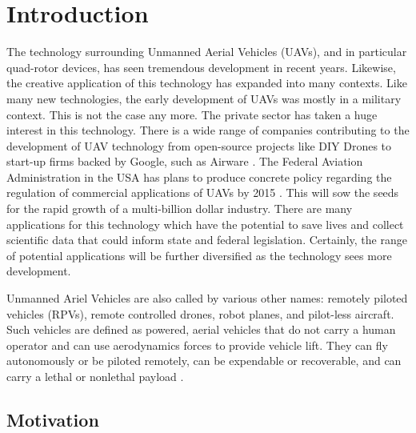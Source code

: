 
\chapter{Introduction} %

\label{Introduction} %



The technology surrounding Unmanned Aerial Vehicles (UAVs), and in particular quad-rotor devices, has seen tremendous development in recent years. Likewise, the creative application of this technology has expanded into many contexts. Like many new technologies, the early development of UAVs was mostly in a military context. This is not the case any more. The private sector has taken a huge interest in this technology. There is a wide range of companies contributing to the development of UAV technology from open-source projects like DIY Drones \cite{diydrones:2014:Online} to start-up firms backed by Google, such as Airware \cite{Airware:2014:Online}.  The Federal Aviation Administration in the USA has plans to produce concrete policy regarding the regulation of commercial applications of UAVs by 2015 \cite{faa:2014:Online}. This will sow the seeds for the rapid growth of a multi-billion dollar industry. There are many applications for this technology which have the potential to save lives and collect scientific data that could inform state and federal legislation. Certainly, the range of potential applications will be further diversified as the technology sees more development.

Unmanned Ariel Vehicles are also called by various other names: remotely piloted vehicles (RPVs), remote controlled drones, robot planes, and pilot-less aircraft. Such vehicles are defined as powered, aerial vehicles that do not carry a human operator and can use aerodynamics forces to provide vehicle lift. They can fly autonomously or be piloted remotely, can be expendable or recoverable, and can carry a lethal or nonlethal payload \cite{bone2004unmanned}.


\section{Motivation}

